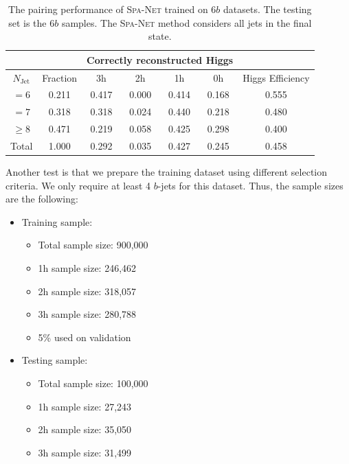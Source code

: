 \documentclass[12pt]{article}
\begin{document}
    \begin{table}[htpb]
        \centering
        \caption{The pairing performance of \textsc{Spa-Net} trained on $6b$ datasets. The testing set is the $6b$ samples. The \textsc{Spa-Net} method considers all jets in the final state.}
        \label{tab:resonant_6b_SPANet_pairing_6b_region}
        \begin{tabular}{c|c|cccc|c}
            \multicolumn{1}{l|}{} &          & \multicolumn{4}{c|}{Correctly reconstructed Higgs} & \multicolumn{1}{l}{} \\ \hline
            $N_\text{Jet}$        & Fraction & 3h          & 2h         & 1h         & 0h         & Higgs Efficiency     \\ \hline
            $=6$                  & 0.211 & 0.417 & 0.000 & 0.414 & 0.168 & 0.555 \\
            $=7$                  & 0.318 & 0.318 & 0.024 & 0.440 & 0.218 & 0.480 \\
            $\ge 8$               & 0.471 & 0.219 & 0.058 & 0.425 & 0.298 & 0.400 \\ \hline
            Total                 & 1.000 & 0.292 & 0.035 & 0.427 & 0.245 & 0.458
        \end{tabular}
    \end{table}

    Another test is that we prepare the training dataset using different selection criteria. We only require at least 4 $b$-jets for this dataset. Thus, the sample sizes are the following:
    \begin{itemize}
        \item Training sample:
        \begin{itemize}
            \item Total sample size: 900,000
            \item 1h sample size: 246,462
            \item 2h sample size: 318,057
            \item 3h sample size: 280,788
            \item 5\% used on validation
        \end{itemize}
        \item Testing sample:
        \begin{itemize}
            \item Total sample size: 100,000
            \item 1h sample size: 27,243
            \item 2h sample size: 35,050
            \item 3h sample size: 31,499
        \end{itemize}
    \end{itemize}
\end{document}
